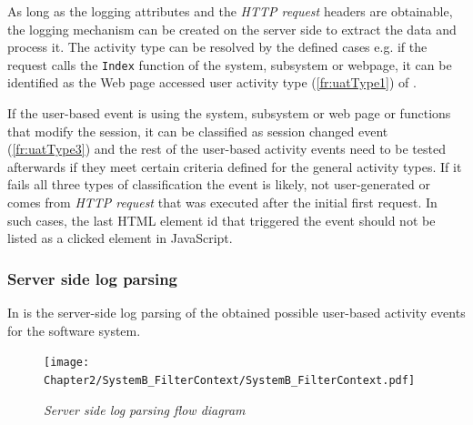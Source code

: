As long as the logging attributes and the \textit{HTTP request} headers are obtainable, the logging mechanism can be created on the server side to extract the data and process it. The activity type can be resolved by the defined cases e.g. if the request calls the \texttt{Index} function of the system, subsystem or webpage, it can be identified as the Web page accessed user activity type (\ref{fr:uatType1}) of .\par If the user-based event is using the system, subsystem or web page or functions that modify the session, it can be classified as session changed event (\ref{fr:uatType3}) and the rest of the user-based activity events need to be tested afterwards if they meet certain criteria defined for the general activity types. If it fails all three types of classification the event is likely, not user-generated or comes from \textit{HTTP request} that was executed after the initial first request. In such cases, the last HTML element id that triggered the event should not be listed as a clicked element in JavaScript.

\subsubsection{Server side log parsing}
In  is the server-side log parsing of the obtained possible user-based activity events for the software system.

\clearpage

\begin{figure}[!htb]
	\centering
	\texttt{[image: Chapter2/SystemB\_FilterContext/SystemB\_FilterContext.pdf]}
	\caption[Server side log parsing flow diagram]
	{\textit{Server side log parsing flow diagram}}\label{fig:ch2_loggingParse}
\end{figure}

\clearpage


